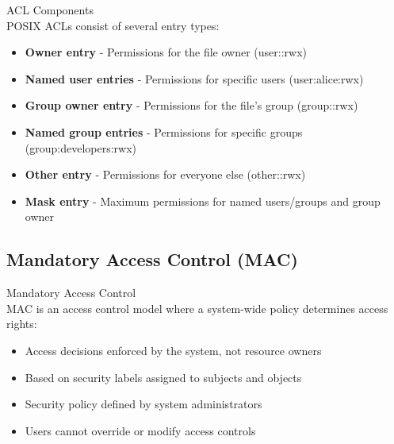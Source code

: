 \begin{concept}{ACL Components}\\
POSIX ACLs consist of several entry types:
\begin{itemize}
    \item \textbf{Owner entry} - Permissions for the file owner (user::rwx)
    \item \textbf{Named user entries} - Permissions for specific users (user:alice:rwx)
    \item \textbf{Group owner entry} - Permissions for the file's group (group::rwx)
    \item \textbf{Named group entries} - Permissions for specific groups (group:developers:rwx)
    \item \textbf{Other entry} - Permissions for everyone else (other::rwx)
    \item \textbf{Mask entry} - Maximum permissions for named users/groups and group owner
\end{itemize}
\end{concept}


\subsection{Mandatory Access Control (MAC)}

\begin{definition}{Mandatory Access Control}\\
MAC is an access control model where a system-wide policy determines access rights:
\begin{itemize}
    \item Access decisions enforced by the system, not resource owners
    \item Based on security labels assigned to subjects and objects
    \item Security policy defined by system administrators
    \item Users cannot override or modify access controls
\end{itemize}
\end{definition}

